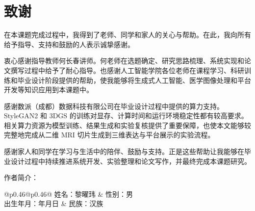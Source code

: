 \chapter*{致\quad 谢}
\thispagestyle{thesis-main}

\thesisbodyfont
\justifying

在本课题完成过程中，我得到了老师、同学和家人的关心与帮助。在此，我向所有给予指导、支持和鼓励的人表示诚挚感谢。

衷心感谢指导教师何长春讲师。何老师在选题确定、研究思路梳理、系统实现和论文撰写过程中给予了耐心指导。也感谢人工智能学院各位老师在课程学习、科研训练和毕业设计阶段提供的帮助，使我能够将生成式人工智能、医学图像处理和平台开发等知识应用到本课题中。

感谢数派（成都）数据科技有限公司在毕业设计过程中提供的算力支持。StyleGAN2 和 3DGS 的训练对显存、计算时间和运行环境稳定性都有较高要求。相关算力资源为模型训练、结果生成和实验复核提供了重要保障，也使本文能够较完整地完成从二维 MRI 切片生成到三维表达与平台展示的实验流程。

感谢家人和同学在学习与生活中的陪伴、鼓励与支持。正是这些帮助让我能够在毕业设计过程中持续推进系统开发、实验整理和论文写作，并最终完成本课题研究。\par

\vspace{0.5\baselineskip}

\noindent 作者简介：\par

\begingroup
\renewcommand{\arraystretch}{1.4}
\noindent\begin{tabular*}{\textwidth}{@{}p{}@{\extracolsep{\fill}}p{}@{}}
姓名：黎曜玮 & 性别：男 \\
出生年月：{}年{}月{}日 & 民族：汉族 \\
 \\
\end{tabular*}
\endgroup\par
